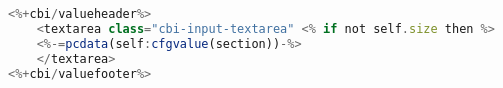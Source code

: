 \begin{lstlisting}[language=javascript,caption={Enhanced Edit Text Box Template.}]
<%+cbi/valueheader%>
    <textarea class="cbi-input-textarea" <% if not self.size then %>         style="width: 100%; font: normal 11pt 'Courier New'"<% else %> cols="<%=self.size%>"<% end %> data-update="change"<%= attr("name", cbid) .. attr("id",    cbid) .. ifattr(self.rows, "rows") .. ifattr(self.wrap, "wrap")  ..          ifattr(self.readonly, "readonly") %>>
    <%-=pcdata(self:cfgvalue(section))-%>
    </textarea>
<%+cbi/valuefooter%>
\end{lstlisting}